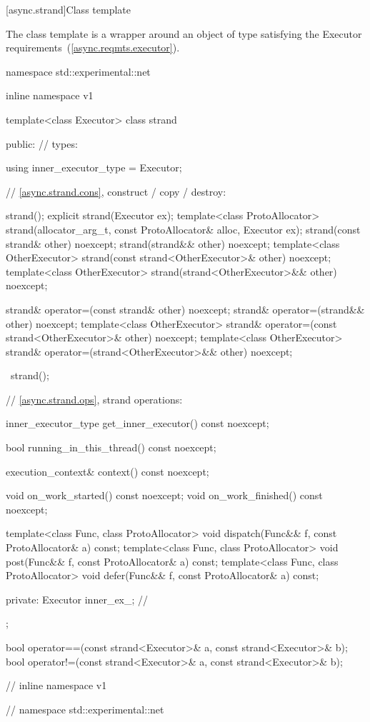 [async.strand]{Class template }

%
\pnum
The class template  is a wrapper around an object of type  satisfying the Executor requirements~(\ref{async.reqmts.executor}).

\begin{codeblock}
namespace std::experimental::net {
inline namespace v1 {

  template<class Executor>
  class strand
  {
  public:
    // types:

    using inner_executor_type = Executor;

    // \ref{async.strand.cons}, construct / copy / destroy:

    strand();
    explicit strand(Executor ex);
    template<class ProtoAllocator>
      strand(allocator_arg_t, const ProtoAllocator& alloc, Executor ex);
    strand(const strand& other) noexcept;
    strand(strand&& other) noexcept;
    template<class OtherExecutor> strand(const strand<OtherExecutor>& other) noexcept;
    template<class OtherExecutor> strand(strand<OtherExecutor>&& other) noexcept;

    strand& operator=(const strand& other) noexcept;
    strand& operator=(strand&& other) noexcept;
    template<class OtherExecutor> strand& operator=(const strand<OtherExecutor>& other) noexcept;
    template<class OtherExecutor> strand& operator=(strand<OtherExecutor>&& other) noexcept;

    ~strand();

    // \ref{async.strand.ops}, strand operations:

    inner_executor_type get_inner_executor() const noexcept;

    bool running_in_this_thread() const noexcept;

    execution_context& context() const noexcept;

    void on_work_started() const noexcept;
    void on_work_finished() const noexcept;

    template<class Func, class ProtoAllocator>
      void dispatch(Func&& f, const ProtoAllocator& a) const;
    template<class Func, class ProtoAllocator>
      void post(Func&& f, const ProtoAllocator& a) const;
    template<class Func, class ProtoAllocator>
      void defer(Func&& f, const ProtoAllocator& a) const;

  private:
    Executor inner_ex_; // \expos
  };

  bool operator==(const strand<Executor>& a, const strand<Executor>& b);
  bool operator!=(const strand<Executor>& a, const strand<Executor>& b);

} // inline namespace v1
} // namespace std::experimental::net
\end{codeblock}


